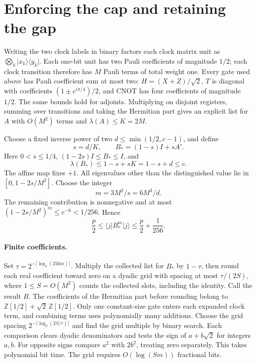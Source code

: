 \documentclass[11pt]{article}
\newcommand{\ket}[1]{\lvert #1\rangle}
\newcommand{\bra}[1]{\langle #1\rvert}
\begin{document}
\section{Enforcing the cap and retaining the gap}
Writing the two clock labels in binary factors each clock matrix unit as \(\bigotimes_k\ket{x_k}\bra{y_k}\). Each one-bit unit has two Pauli coefficients of magnitude \(1/2\); each clock transition therefore has \(M\) Pauli terms of total weight one. Every gate used above has Pauli coefficient sum at most two: \(H=(X+Z)/\sqrt 2\), \(T\) is diagonal with coefficients \((1\pm e^{i\pi/4})/2\), and \(\mathrm{CNOT}\) has four coefficients of magnitude \(1/2\). The same bounds hold for adjoints. Multiplying on disjoint registers, summing over transitions and taking the Hermitian part gives an explicit list for \(A\) with \(O(M^2)\) terms and \(\lambda(A)\le K=2M\).

Choose a fixed inverse power of two \(d\le\min(1/2,c-1)\), and define
\[
 s=d/K,\qquad B_*=(1-s)I+sA'.
\]
Here \(0<s\le1/4\), \((1-2s)I\le B_*\le I\), and
\[
 \lambda(B_*)\le1-s+sK = 1-s+d\le c.
\]
The affine map fixes \(+1\). All eigenvalues other than the distinguished value lie in \([0,1-2s/M^2]\). Choose the integer
\[
 m=3M^2/s=6M^3/d .
\]
The remaining contribution is nonnegative and at most
\((1-2s/M^2)^m\le e^{-6}<1/256\). Hence
\[
 \frac p2\le\bra j B_*^m\ket j\le\frac p2+\frac1{256}.
\]

\paragraph{Finite coefficients.}
Set \(\tau=2^{-\lceil\log_2(256m)\rceil}\). Multiply the collected list for \(B_*\) by \(1-\tau\), then round each real coefficient toward zero on a dyadic grid with spacing at most \(\tau/(2S)\), where \(1\le S=O(M^2)\) counts the collected slots, including the identity. Call the result \(B\). The coefficients of the Hermitian part before rounding belong to \(\mathbb Z[1/2]+\sqrt{2}\,\mathbb Z[1/2]\). Only one constant-size gate enters each expanded clock term, and combining terms uses polynomially many additions. Choose the grid spacing \(2^{-\lceil\log_2(2S/\tau)\rceil}\) and find the grid multiple by binary search. Each comparison clears dyadic denominators and tests the sign of \(a+b\sqrt2\) for integers \(a,b\). For opposite signs compare \(a^2\) with \(2b^2\), treating zero separately. This takes polynomial bit time. The grid requires \(O(\log(Sm))\) fractional bits.
\end{document}
